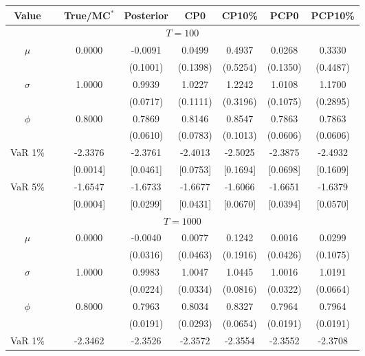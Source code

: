{ \renewcommand{\arraystretch}{1.2} 
{\footnotesize
\begin{table} 
\center 
\begin{tabular}{cc cccccc} 
Value & & True/MC$^*$ & Posterior & CP0  & CP10\% & PCP0  & PCP10\% \\ \hline 
\hline 
\multicolumn{8}{c}{$T =100$}  \\ 
\hline 
\rowcolor{LightCyan} $\mu$&& 0.0000 & -0.0091 & 0.0499 & 0.4937 & 0.0268 & 0.3330 \\ 
&&   & (0.1001) & (0.1398) & (0.5254) & (0.1350) & (0.4487) \\ 
\rowcolor{LightCyan} $\sigma$&& 1.0000 & 0.9939 & 1.0227 & 1.2242 & 1.0108 & 1.1700 \\ 
&&   & (0.0717) & (0.1111) & (0.3196) & (0.1075) & (0.2895) \\ 
\rowcolor{LightCyan} $\phi$&& 0.8000 & 0.7869 & 0.8146 & 0.8547 & 0.7863 & 0.7863 \\ 
&&   & (0.0610) & (0.0783) & (0.1013) & (0.0606) & (0.0606) \\ 
\rowcolor{LightCyan} VaR 1\% && -2.3376 & -2.3761 & -2.4013 & -2.5025 & -2.3875 & -2.4932 \\ 
  && [0.0014] & [0.0461] & [0.0753] & [0.1694] & [0.0698] & [0.1609] \\ 
\rowcolor{LightCyan} VaR 5\% && -1.6547 & -1.6733 & -1.6677 & -1.6066 & -1.6651 & -1.6379 \\ 
 && [0.0004] & [0.0299] & [0.0431] & [0.0670] & [0.0394] & [0.0570] \\ 
\hline 
\multicolumn{8}{c}{$T =1000$}  \\ 
\hline 
\rowcolor{LightCyan} $\mu$&& 0.0000 & -0.0040 & 0.0077 & 0.1242 & 0.0016 & 0.0299 \\ 
&&   & (0.0316) & (0.0463) & (0.1916) & (0.0426) & (0.1075) \\ 
\rowcolor{LightCyan} $\sigma$&& 1.0000 & 0.9983 & 1.0047 & 1.0445 & 1.0016 & 1.0191 \\ 
&&   & (0.0224) & (0.0334) & (0.0816) & (0.0322) & (0.0664) \\ 
\rowcolor{LightCyan} $\phi$&& 0.8000 & 0.7963 & 0.8034 & 0.8327 & 0.7964 & 0.7964 \\ 
&&   & (0.0191) & (0.0293) & (0.0654) & (0.0191) & (0.0191) \\ 
\rowcolor{LightCyan} VaR 1\% && -2.3462 & -2.3526 & -2.3572 & -2.3554 & -2.3552 & -2.3708 \\ 

\end{tabular}
\end{table}}}
